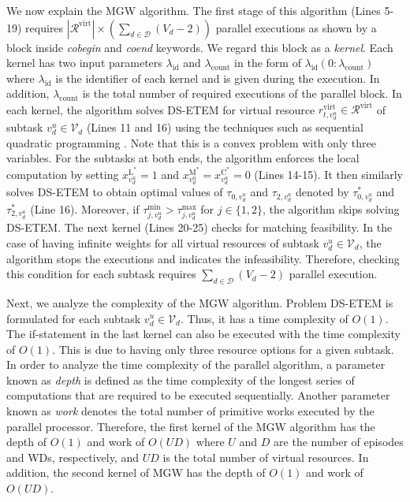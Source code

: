 \documentclass[12pt,draftclsnofoot,onecolumn]{IEEEtran}
\begin{document}
We now explain the MGW algorithm. The first stage of this algorithm (Lines 5-19) requires $|\mathcal{R}^{\text{virt}}|\times \left(\sum_{d\in\mathcal{D}}\left(V_d-2\right)\right)$ parallel executions as shown by a block inside \textit{cobegin} and \textit{coend} keywords. We regard this block as a \textit{kernel}. Each kernel has two input parameters $\lambda_{\text{id}}$ and $\lambda_{\text{count}}$ in the form of $\lambda_\text{id}(0:\lambda_{\text{count}})$ where $\lambda_{\text{id}}$ is the identifier of each kernel and is given during the execution. In addition, $\lambda_{\text{count}}$ is the total number of required executions of the parallel block. In each kernel, the algorithm solves DS-ETEM for virtual resource $r_{t,v_d^u}^{\text{virt}}\in\mathcal{R}^{\text{virt}}$ of subtask $v_d^u\in\mathcal{V}_d$ (Lines 11 and 16) using the techniques such as sequential quadratic programming \cite{b31}. Note that this is a convex problem with only three variables. For the subtasks at both ends, the algorithm enforces the local computation by setting $x^{\text{L}^{\ast}}_{v_d^u} = 1$ and $x^{\text{M}^{\ast}}_{v_d^u} = x^{\text{C}^{\ast}}_{v_d^u} = 0$ (Lines 14-15). It then similarly solves DS-ETEM to obtain optimal values of $\tau_{0,v_d^u}$ and $\tau_{2,v_d^u}$ denoted by $\tau_{0,v_d^u}^{\ast}$ and $\tau_{2,v_d^u}^{\ast}$ (Line 16). Moreover, if $\tau_{j,v_d^u}^{\min} > \tau_{j,v_d^u}^{\max}$ for $j\in\{1,2\}$, the algorithm skips solving DS-ETEM. The next kernel (Lines 20-25) checks for matching feasibility. In the case of having infinite weights for all virtual resources of subtask $v_d^u\in\mathcal{V}_d$, the algorithm stops the executions and indicates the infeasibility. Therefore, checking this condition for each subtask requires $\sum_{d\in\mathcal{D}}\left(V_d-2\right)$ parallel execution.

Next, we analyze the complexity of the MGW algorithm. Problem DS-ETEM is formulated for each subtask $v_d^u\in\mathcal{V}_d$. Thus, it has a time complexity of $O(1)$. The if-statement in the last kernel can also be executed with the time complexity of $O(1)$. This is due to having only three resource options for a given subtask. In order to analyze the time complexity of the parallel algorithm, a parameter known as \textit{depth}\cite{b23} is defined as the time complexity of the longest series of computations that are required to be executed sequentially. Another parameter known as \textit{work}\cite{b23} denotes the total number of primitive works executed by the parallel processor. Therefore, the first kernel of the MGW algorithm has the depth of $O(1)$ and work of $O(UD)$ where $U$ and $D$ are the number of episodes and WDs, respectively, and $UD$ is the total number of virtual resources. In addition, the second kernel of MGW has the depth of $O(1)$ and work of $O(UD)$.
\end{document}
